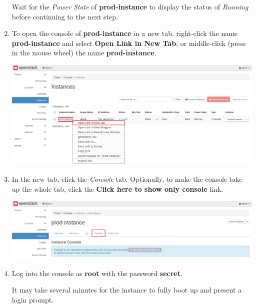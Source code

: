 \documentclass[letterpaper, 12pt]{article}
\begin{document}
\begin{enumerate}
    \begin{stopbox}
        Wait for the \textit{Power State} of \textbf{prod-instance} to display the status of \textit{Running} before continuing to the next step.
    \end{stopbox}

    \item To open the console of \textbf{prod-instance} in a new tab, right-click the name \textbf{prod-instance} and select \textbf{Open Link in New Tab}, or middle-click (press in the mouse wheel) the name \textbf{prod-instance}.

    \begin{center}
        \includegraphics[width=\linewidth]{images/part1/step11.png}
    \end{center}

    \item In the new tab, click the \textit{Console} tab.
    Optionally, to make the console take up the whole tab, click the \textbf{Click here to show only console} link.

    \begin{center}
        \includegraphics[width=\linewidth]{images/part1/step12.png}
    \end{center}

    \item Log into the console as \textbf{root} with the password \textbf{secret}.

    \begin{notebox}
        It may take several minutes for the instance to fully boot up and present a login prompt.
    \end{notebox}


\end{enumerate}
\end{document}
